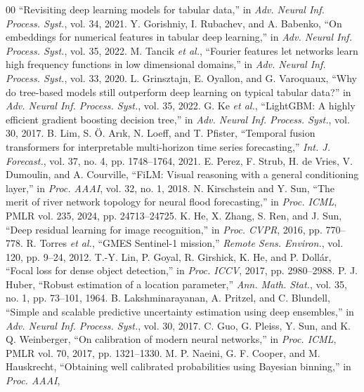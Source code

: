 \documentclass[conference]{IEEEtran}
\begin{document}
\begin{thebibliography}{00}
``Revisiting deep learning models for tabular data,'' in \emph{Adv. Neural Inf.
Process. Syst.}, vol. 34, 2021.
 Y. Gorishniy, I. Rubachev, and A. Babenko, ``On
embeddings for numerical features in tabular deep learning,'' in \emph{Adv.
Neural Inf. Process. Syst.}, vol. 35, 2022.
 M. Tancik \emph{et al.}, ``Fourier features let networks
learn high frequency functions in low dimensional domains,'' in \emph{Adv.
Neural Inf. Process. Syst.}, vol. 33, 2020.
 L. Grinsztajn, E. Oyallon, and G. Varoquaux, ``Why do
tree-based models still outperform deep learning on typical tabular data?'' in
\emph{Adv. Neural Inf. Process. Syst.}, vol. 35, 2022.
 G. Ke \emph{et al.}, ``LightGBM: A highly efficient gradient
boosting decision tree,'' in \emph{Adv. Neural Inf. Process. Syst.}, vol. 30,
2017.
 B. Lim, S. \"O. Ar{\i}k, N. Loeff, and T. Pfister, ``Temporal
fusion transformers for interpretable multi-horizon time series forecasting,''
\emph{Int. J. Forecast.}, vol. 37, no. 4, pp. 1748--1764, 2021.
 E. Perez, F. Strub, H. de Vries, V. Dumoulin, and
A. Courville, ``FiLM: Visual reasoning with a general conditioning layer,''
in \emph{Proc. AAAI}, vol. 32, no. 1, 2018.
 N. Kirschstein and Y. Sun, ``The merit of river
network topology for neural flood forecasting,'' in \emph{Proc. ICML},
PMLR vol. 235, 2024, pp. 24713--24725.
 K. He, X. Zhang, S. Ren, and J. Sun, ``Deep residual learning
for image recognition,'' in \emph{Proc. CVPR}, 2016, pp. 770--778.
 R. Torres \emph{et al.}, ``GMES Sentinel-1 mission,''
\emph{Remote Sens. Environ.}, vol. 120, pp. 9--24, 2012.
 T.-Y. Lin, P. Goyal, R. Girshick, K. He, and P. Doll\'{a}r,
``Focal loss for dense object detection,'' in \emph{Proc. ICCV}, 2017,
pp. 2980--2988.
 P. J. Huber, ``Robust estimation of a location
parameter,'' \emph{Ann. Math. Stat.}, vol. 35, no. 1, pp. 73--101, 1964.
 B. Lakshminarayanan, A. Pritzel, and C. Blundell,
``Simple and scalable predictive uncertainty estimation using deep ensembles,''
in \emph{Adv. Neural Inf. Process. Syst.}, vol. 30, 2017.
 C. Guo, G. Pleiss, Y. Sun, and K. Q. Weinberger, ``On
calibration of modern neural networks,'' in \emph{Proc. ICML}, PMLR vol. 70,
2017, pp. 1321--1330.
 M. P. Naeini, G. F. Cooper, and M. Hauskrecht, ``Obtaining
well calibrated probabilities using Bayesian binning,'' in \emph{Proc. AAAI},

\end{thebibliography}
\end{document}
